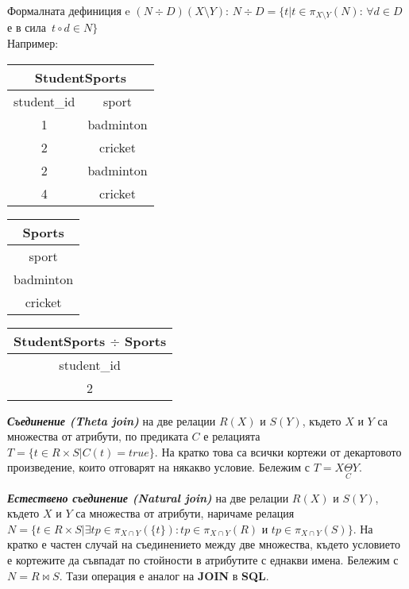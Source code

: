 \documentclass[fleqn,12pt]{article}
\begin{document}
Формалната дефиниция e $(N \div D)(X \setminus Y): \, N \div D = \{t | t \in \pi_{X \setminus Y} (N) :\, \forall d \in D \,$ е в сила $\, t \circ d \in N \}$\\
Например:\\

\begin{multicols}{3}
\begin{center}
\begin{tabular}{ |c|c| }
    \hline
    \multicolumn{2}{|c|}{StudentSports} \\
    \hline
    student\_id & sport \\
    \hline
    1 & badminton \\
    2 & cricket \\
    2 & badminton \\
    4 & cricket \\
    \hline
\end{tabular}
\end{center}

\begin{center}
\begin{tabular}{ |c| } 
    \hline
    \multicolumn{1}{|c|}{Sports} \\
    \hline
    sport \\
    \hline
    badminton \\
    cricket \\
    \hline
\end{tabular}
\end{center}

\begin{center}
\begin{tabular}{ |c| } 
    \hline
    \multicolumn{1}{|c|}{StudentSports $\div$ Sports} \\
    \hline
    student\_id \\
    \hline
    2 \\
    \hline
\end{tabular}
\end{center}

\end{multicols}

\textbf{\textit{Съединение (Theta join)}} на две релации $R(X)$ и $S(Y)$, където $X$ и $Y$ са множества от атрибути, по предиката $C$ е релацията $T = \{t \in R \times S | C(t) = true\}$.
На кратко това са всички кортежи от декартовото произведение, които отговарят на някакво условие.
\bigbreak
Бележим с $T = X \underset{C}{\Theta} Y$.

\textbf{\textit{Естествено съединение (Natural join)}} на две релации $R(X)$ и $S(Y)$, където $X$ и $Y$ са множества от атрибути, наричаме релация $N = \{t \in R \times S | \exists tp \in \pi_{X \cap Y}(\{t\}): tp \in \pi_{X \cap Y}(R)$ и $tp \in \pi_{X \cap Y}(S)\}$.
На кратко е частен случай на съединението между две множества, където условието е кортежите да съвпадат по стойности в атрибутите с еднакви имена.
\bigbreak
Бележим с $N = R \bowtie S$. Тази операция е аналог на \textbf{JOIN} в \textbf{SQL}.
\end{document}
